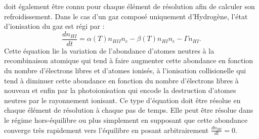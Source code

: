  doit également être connu pour chaque élément de résolution afin de calculer son refroidissement. Dans le cas d'un gaz composé uniquement d'Hydrogène, l'état d'ionisation du gaz est régi par :
\begin{equation}
\frac{dn_{HI}}{dt}=\alpha(T) n_{HII} n_e-\beta(T) n_{HI}n_e-\Gamma n_{HI}.
\label{e:eint}
\end{equation}
Cette équation lie la variation de l'abondance d'atomes neutres à la recombinaison atomique  qui tend à faire augmenter cette abondance en fonction du nombre d'électrons libres et d'atomes ionisés, à l'ionisation collisionelle  qui tend à diminuer cette abondance en fonction du nombre d'électrons libres à nouveau et enfin par la photoionisation  qui encode la destruction d'atomes neutres par le rayonnement ionisant. Ce type d'équation doit être résolue en chaque élément de résolution à chaque pas de temps. Elle peut être résolue dans le régime hors-équilibre  ou plus simplement en supposant que cette abondance converge très rapidement vers l'équilibre en posant arbitrairement $\frac{dn_{HI}}{dt}=0$.


